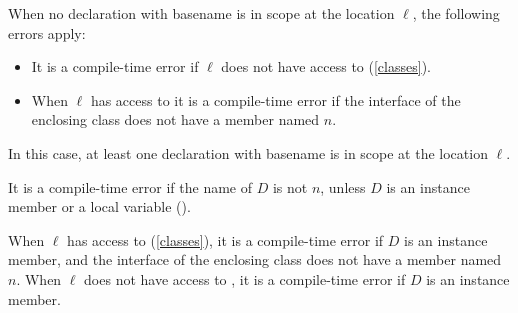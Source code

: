 \documentclass[makeidx]{article}
\begin{document}
{\LMHash{}%
When no declaration with basename \id{} is in scope at the location $\ell$,
the following errors apply:

\begin{itemize}
\item
  It is a compile-time error if $\ell$ does not have access to \THIS{}
  (\ref{classes}).
\item
  When $\ell$ has access to \THIS{}
  it is a compile-time error if the interface of the enclosing class
  does not have a member named $n$.
\end{itemize}
\vspace{-2ex}
\EndCase

\LMHash{}%
In this case, at least one declaration with basename \id{}
is in scope at the location $\ell$.

\LMHash{}%
It is a compile-time error if the name of $D$ is not $n$,
unless $D$ is an instance member or a local variable
().

\LMHash{}%
When $\ell$ has access to \THIS{}
(\ref{classes}),
it is a compile-time error if $D$ is an instance member,
and the interface of the enclosing class does not have a member named $n$.
When $\ell$ does not have access to \THIS,
it is a compile-time error if $D$ is an instance member.
\EndCase


}
\end{document}
